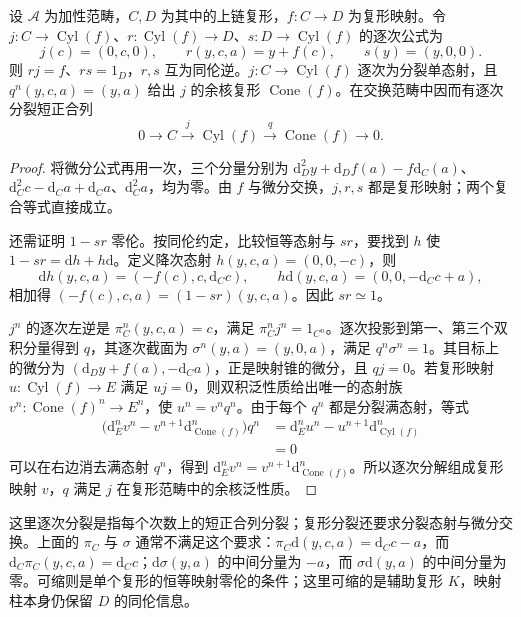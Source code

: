 \begin{proposition}\label{b4:prop:cylinder-factorization}
	设 \(\mathcal A\) 为加性范畴，\(C,D\) 为其中的上链复形，\(f:C\to D\) 为复形映射。令 \(j:C\to\operatorname{Cyl}(f)\)、\(r:\operatorname{Cyl}(f)\to D\)、\(s:D\to\operatorname{Cyl}(f)\) 的逐次公式为
	\[
		j(c)=(0,c,0),\qquad r(y,c,a)=y+f(c),\qquad s(y)=(y,0,0).
	\]
	则 \(rj=f\)、\(rs=1_D\)，\(r,s\) 互为同伦逆。\(j:C\to\operatorname{Cyl}(f)\) 逐次为分裂单态射，且 \(q^n(y,c,a)=(y,a)\) 给出 \(j\) 的余核复形 \(\operatorname{Cone}(f)\)。在交换范畴中因而有逐次分裂短正合列
	\[
		0\longrightarrow C\xrightarrow{j}\operatorname{Cyl}(f) \xrightarrow{q}\operatorname{Cone}(f)\longrightarrow0.
	\]
\end{proposition}
\begin{proof}
	将微分公式再用一次，三个分量分别为 \(\mathrm{d}_D^2y+\mathrm{d}_Df(a)-f\mathrm{d}_C(a)\)、\(\mathrm{d}_C^2c-\mathrm{d}_Ca+\mathrm{d}_Ca\)、\(\mathrm{d}_C^2a\)，均为零。由 \(f\) 与微分交换，\(j,r,s\) 都是复形映射；两个复合等式直接成立。

	还需证明 \(1-sr\) 零伦。按同伦约定，比较恒等态射与 \(sr\)，要找到 \(h\) 使 \(1-sr=\mathrm{d}h+h\mathrm{d}\)。定义降次态射 \(h(y,c,a)=(0,0,-c)\)，则
	\[
		\mathrm{d}h(y,c,a)=(-f(c),c,\mathrm{d}_Cc),\qquad h\mathrm{d}(y,c,a)=(0,0,-\mathrm{d}_Cc+a),
	\]
	相加得 \((-f(c),c,a)=(1-sr)(y,c,a)\)。因此 \(sr\simeq1\)。

	\(j^n\) 的逐次左逆是 \(\pi_C^n(y,c,a)=c\)，满足 \(\pi_C^nj^n=1_{C^n}\)。逐次投影到第一、第三个双积分量得到 \(q\)，其逐次截面为 \(\sigma^n(y,a)=(y,0,a)\)，满足 \(q^n\sigma^n=1\)。其目标上的微分为 \((\mathrm{d}_Dy+f(a),-\mathrm{d}_Ca)\)，正是映射锥的微分，且 \(qj=0\)。若复形映射 \(u:\operatorname{Cyl}(f)\to E\) 满足 \(uj=0\)，则双积泛性质给出唯一的态射族 \(v^n:\operatorname{Cone}(f)^n\to E^n\)，使 \(u^n=v^nq^n\)。由于每个 \(q^n\) 都是分裂满态射，等式
	\[
		\begin{aligned}
			\bigl(\mathrm{d}_E^nv^n-v^{n+1}\mathrm{d}_{\operatorname{Cone}(f)}^n\bigr)q^n &=\mathrm{d}_E^nu^n-u^{n+1}\mathrm{d}_{\operatorname{Cyl}(f)}^n\\
			&=0
		\end{aligned}
	\]
	可以在右边消去满态射 \(q^n\)，得到 \(\mathrm{d}_E^nv^n=v^{n+1}\mathrm{d}_{\operatorname{Cone}(f)}^n\)。所以逐次分解组成复形映射 \(v\)，\(q\) 满足 \(j\) 在复形范畴中的余核泛性质。
\end{proof}

这里逐次分裂是指每个次数上的短正合列分裂；复形分裂还要求分裂态射与微分交换。上面的 \(\pi_C\) 与 \(\sigma\) 通常不满足这个要求：\(\pi_C\mathrm{d}(y,c,a)=\mathrm{d}_Cc-a\)，而 \(\mathrm{d}_C\pi_C(y,c,a)=\mathrm{d}_Cc\)；\(\mathrm{d}\sigma(y,a)\) 的中间分量为 \(-a\)，而 \(\sigma\mathrm{d}(y,a)\) 的中间分量为零。可缩则是单个复形的恒等映射零伦的条件；这里可缩的是辅助复形 \(K\)，映射柱本身仍保留 \(D\) 的同伦信息。


